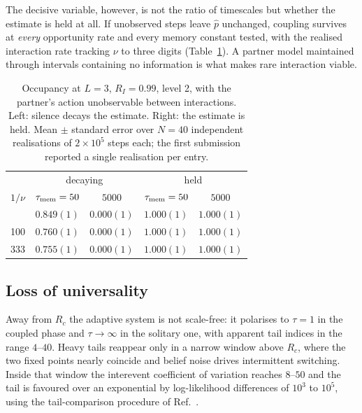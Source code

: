 \documentclass[aps,pre,twocolumn,superscriptaddress,floatfix,longbibliography]{revtex4-2}
\begin{document}
The decisive variable, however, is not the ratio of timescales but whether the
estimate is held at all. If unobserved steps leave $\hat p$ unchanged, coupling
survives at \emph{every} opportunity rate and every memory constant tested, with
the realised interaction rate tracking $\nu$ to three digits
(Table~\ref{tab:hold}). A partner model maintained through intervals containing
no information is what makes rare interaction viable.

\begin{table}[t]
\caption{Occupancy at $L=3$, $R_I=0.99$, level 2, with the partner's action
unobservable between interactions. Left: silence decays the estimate. Right:
the estimate is held. Mean $\pm$ standard error over $N=40$ independent
realisations of $2\times10^{5}$ steps each; the first submission reported a
single realisation per entry.}
\label{tab:hold}
\begin{ruledtabular}
\begin{tabular}{ccccc}
 & \multicolumn{2}{c}{decaying} & \multicolumn{2}{c}{held} \\
$1/\nu$ & $\tau_{\rm mem}=50$ & $5000$ & $\tau_{\rm mem}=50$ & $5000$ \\
\colrule
10 & $0.849(1)$ & $0.000(1)$ & $1.000(1)$ & $1.000(1)$ \\
100 & $0.760(1)$ & $0.000(1)$ & $1.000(1)$ & $1.000(1)$ \\
333 & $0.755(1)$ & $0.000(1)$ & $1.000(1)$ & $1.000(1)$ \\
\end{tabular}
\end{ruledtabular}
\end{table}

\subsection{Loss of universality}
\label{sec:universality}

Away from $R_c$ the adaptive system is not scale-free: it polarises to
$\tau=1$ in the coupled phase and $\tau\to\infty$ in the solitary one, with
apparent tail indices in the range $4$--$40$. Heavy tails reappear only in a
narrow window above $R_c$, where the two fixed points nearly coincide and belief
noise drives intermittent switching. Inside that window the interevent
coefficient of variation reaches $8$--$50$ and the tail is favoured over an
exponential by log-likelihood differences of $10^{3}$ to $10^{5}$, using the
tail-comparison procedure of Ref.~\cite{clauset2009}.
\end{document}
